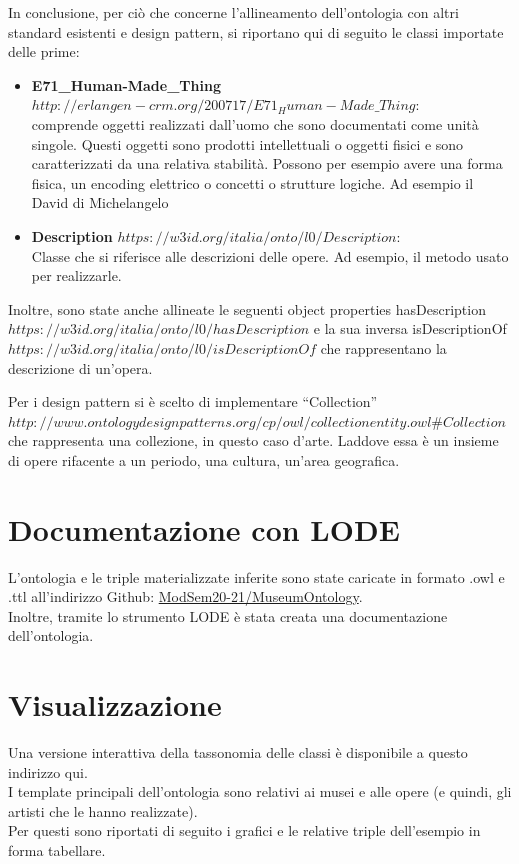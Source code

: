 \documentclass[12pt]{article}
\begin{document}
In conclusione, per ciò che concerne l’allineamento dell’ontologia con altri standard esistenti e design pattern, si riportano qui di seguito le classi importate delle prime:
\begin{itemize}
 \item \textbf{E71\_Human-Made\_Thing} $http://erlangen-crm.org/200717/E71_Human-Made\_Thing$:\\ comprende oggetti realizzati dall’uomo che sono documentati come unità singole. Questi oggetti sono prodotti intellettuali o oggetti fisici e sono caratterizzati da una relativa stabilità. Possono per esempio avere una forma fisica, un encoding elettrico o concetti o strutture logiche. Ad esempio il David di Michelangelo
 \item \textbf{Description} $https://w3id.org/italia/onto/l0/Description$:\\ Classe che si riferisce alle descrizioni delle opere. Ad esempio, il metodo usato per realizzarle.
\end{itemize} 
 
 Inoltre, sono state anche allineate le seguenti object properties hasDescription \\$https://w3id.org/italia/onto/l0/hasDescription$ e la sua inversa isDescriptionOf \\$https://w3id.org/italia/onto/l0/isDescriptionOf$ che rappresentano la descrizione di un’opera.

Per i design pattern si è scelto di implementare “Collection” \\$http://www.ontologydesignpatterns.org/cp/owl/collectionentity.owl\#Collection$ che rappresenta una collezione, in questo caso d'arte. Laddove essa è un insieme di opere rifacente a un periodo, una cultura, un'area geografica.
\newpage
\section{Documentazione con LODE}
L’ontologia e le triple materializzate inferite sono state caricate in formato .owl e .ttl all'indirizzo Github: \href{https://github.com/ModSem20-21/MuseumOntology/tree/master/Ontologia}{ModSem20-21/MuseumOntology}.\\
Inoltre, tramite lo strumento LODE è stata creata una documentazione dell’ontologia. 
\newpage
\section{Visualizzazione}
Una versione interattiva della tassonomia delle classi è disponibile a questo indirizzo qui.\\
I template principali dell'ontologia sono relativi ai musei e alle opere (e quindi, gli artisti che le hanno realizzate).\\
Per questi sono riportati di seguito i grafici e le relative triple dell'esempio in forma tabellare.
\end{document}
